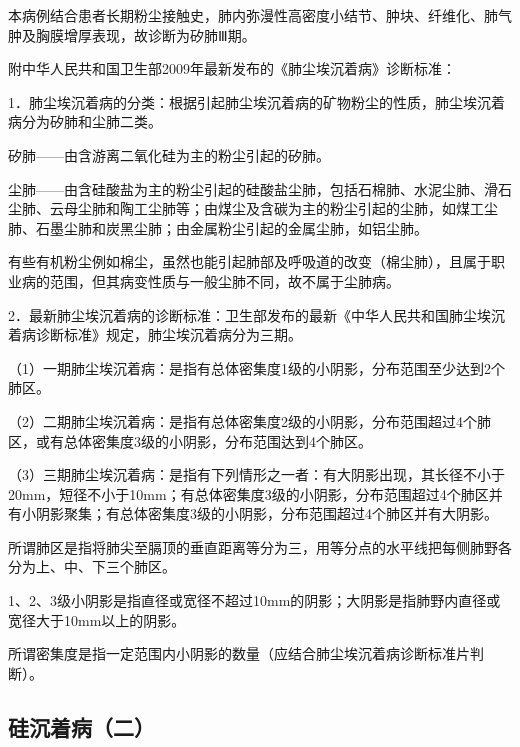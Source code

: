 本病例结合患者长期粉尘接触史，肺内弥漫性高密度小结节、肿块、纤维化、肺气肿及胸膜增厚表现，故诊断为矽肺Ⅲ期。

附中华人民共和国卫生部2009年最新发布的《肺尘埃沉着病》诊断标准：

1．肺尘埃沉着病的分类：根据引起肺尘埃沉着病的矿物粉尘的性质，肺尘埃沉着病分为矽肺和尘肺二类。

矽肺------由含游离二氧化硅为主的粉尘引起的矽肺。

尘肺------由含硅酸盐为主的粉尘引起的硅酸盐尘肺，包括石棉肺、水泥尘肺、滑石尘肺、云母尘肺和陶工尘肺等；由煤尘及含碳为主的粉尘引起的尘肺，如煤工尘肺、石墨尘肺和炭黑尘肺；由金属粉尘引起的金属尘肺，如铝尘肺。

有些有机粉尘例如棉尘，虽然也能引起肺部及呼吸道的改变（棉尘肺），且属于职业病的范围，但其病变性质与一般尘肺不同，故不属于尘肺病。

2．最新肺尘埃沉着病的诊断标准：卫生部发布的最新《中华人民共和国肺尘埃沉着病诊断标准》规定，肺尘埃沉着病分为三期。

（1）一期肺尘埃沉着病：是指有总体密集度1级的小阴影，分布范围至少达到2个肺区。

（2）二期肺尘埃沉着病：是指有总体密集度2级的小阴影，分布范围超过4个肺区，或有总体密集度3级的小阴影，分布范围达到4个肺区。

（3）三期肺尘埃沉着病：是指有下列情形之一者：有大阴影出现，其长径不小于20mm，短径不小于10mm；有总体密集度3级的小阴影，分布范围超过4个肺区并有小阴影聚集；有总体密集度3级的小阴影，分布范围超过4个肺区并有大阴影。

所谓肺区是指将肺尖至膈顶的垂直距离等分为三，用等分点的水平线把每侧肺野各分为上、中、下三个肺区。

1、2、3级小阴影是指直径或宽径不超过10mm的阴影；大阴影是指肺野内直径或宽径大于10mm以上的阴影。

所谓密集度是指一定范围内小阴影的数量（应结合肺尘埃沉着病诊断标准片判断）。

\subsection{硅沉着病（二）}

